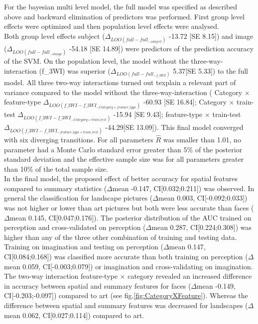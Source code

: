 \documentclass[a4paper,man,natbib,floatsintext]{apa6}
\begin{document}
For the bayesian multi level model, the full model was specified as described above and backward elimination of predictors was performed. First group level effects were optimized and then population level effects were analysed. \\
Both group level effects subject ($\Delta_{LOO(full - full_{-subject})}$ -13.72 [SE 8.15]) and image ($\Delta_{LOO(full - full_{-image})}$ -54.18 [SE  14.89]) were predictors of the prediction accuracy of the SVM. 
On the population level, the model without the three-way-interaction (f\_3WI) was superior ($\Delta_{LOO(full - full_{-f\_3WI})}$ 5.37[SE 5.33]) to the full model.  All three two-way interactions turned out texplain a relevant part of variance compared to the model without the three-way-interaction (
Category $\times$ feature-type $\Delta_{LOO(f\_3WI - f\_3WI_{-Category \times feature\_type})}$ -60.93 [SE 16.84]; 
Category $\times$ train-test $\Delta_{LOO(f\_3WI- f\_3WI_{-Category \times train\_test})}$ -15.94 [SE  9.43];
feature-type $\times$ train-test $\Delta_{LOO(f\_3WI- f\_3WI_{- feature\_type\times train\_test})}$ -44.29[SE  13.09]).
This final model converged with six diverging transitions. For all parameters $\hat{R}$ was smaller than 1.01, no parameter had a Monte Carlo standard error greater than 5\% of the posterior standard deviation and the effective sample size was for all parameters greater than 10\% of the total sample size.\\

In the final model, the proposed effect of better accuracy for spatial features compared to summary statistics ($\Delta$mean -0.147, CI[0.032;0.211]) was observed. 
In general the classification for landscape pictures ($\Delta$mean 0.003, CI[-0.092;0.033]) was not higher or lower than art pictures but both were less accurate than faces ($\Delta$mean 0.145, CI[0.047;0.176]). 
The posterior distribution of the AUC trained on perception and cross-validated on perception ($\Delta$mean 0.287, CI[0.224;0.308]) was higher than any of the three other combination of training and testing data. 
Training on imagination and testing on perception ($\Delta$mean 0.147, CI[0.084;0.168]) was classified more accurate than both training on perception ($\Delta$mean 0.059, CI[-0.003;0.079]) or imagination and cross-validating on imagination. \\

The two-way interaction feature-type $\times$ category revealed an increased difference in accuracy between spatial and summary features for faces ($\Delta$mean -0.149, CI[-0.203;-0.097]) compared to art (see fig.\ref{fig:CategoryXFeature}). 
Whereas the difference between spatial and summary features was decreased for landscapes ($\Delta$mean 0.062, CI[0.027;0.114]) compared to art. 
\end{document}
